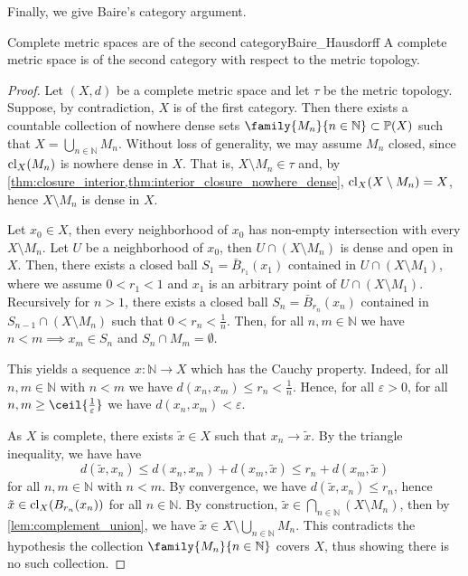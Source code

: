 Finally, we give Baire's category argument.
\begin{theorem}{Complete metric spaces are of the second category}{Baire_Hausdorff}
    A complete metric space is of the second category with respect to the metric topology.
\end{theorem}
\begin{proof}
    Let \((X, d)\) be a complete metric space and let \(\tau\) be the metric topology. Suppose, by contradiction, \(X\) is of the first category. Then there exists a countable collection of nowhere dense sets \(\family{M_n}{n \in \mathbb{N}} \subset \mathbb{P}(X)\) such that \(X = \bigcup_{n \in \mathbb{N}} M_n\). Without loss of generality, we may assume \(M_n\) closed, since \(\operatorname{cl}_X(M_n)\) is nowhere dense in \(X\). That is, \(X \setminus M_n \in \tau\) and, by \cref{thm:closure_interior,thm:interior_closure_nowhere_dense}, \(\operatorname{cl}_X(X \setminus M_n) = X\), hence \(X \setminus M_n\) is dense in \(X\).

    Let \(x_0 \in X\), then every neighborhood of \(x_0\) has non-empty intersection with every \(X\setminus M_n\). Let \(U\) be a neighborhood of \(x_0\), then \(U \cap (X\setminus M_n)\) is dense and open in \(X\). Then, there exists a closed ball \(S_1 = \bar{B}_{r_1}(x_1)\) contained in \(U \cap (X \setminus M_1)\), where we assume \(0 < r_1 < 1\) and \(x_1\) is an arbitrary point of \(U \cap (X \setminus M_1)\). Recursively for \(n > 1\), there exists a closed ball \(S_n = \bar{B}_{r_n}(x_n)\) contained in \(S_{n-1} \cap (X \setminus M_n)\) such that \(0 < r_n < \frac1n\). Then, for all \(n,m \in \mathbb{N}\) we have \(n < m \implies x_m \in S_n\) and \(S_n \cap M_m = \emptyset\).

    This yields a sequence \(x : \mathbb{N} \to X\) which has the Cauchy property. Indeed, for all \(n,m \in \mathbb{N}\) with \(n < m\) we have \(d(x_n, x_m) \leq r_n < \frac1n\). Hence, for all \(\varepsilon > 0\), for all \(n,m \geq \ceil{\frac{1}{\varepsilon}}\) we have \(d(x_n,x_m) < \varepsilon\).


    As \(X\) is complete, there exists \(\tilde{x} \in X\) such that \(x_n \to \tilde{x}\). By the triangle inequality, we have have
    \begin{equation*}
        d(\tilde{x}, x_n) \leq d(x_n, x_m) + d(x_m, \tilde{x}) \leq r_n + d(x_m, \tilde{x})
    \end{equation*}
    for all \(n,m \in \mathbb{N}\) with \(n < m\). By convergence, we have \(d(\tilde{x}, x_n) \leq r_n\), hence \(\tilde{x} \in \operatorname{cl}_X(B_{r_n}(x_n))\) for all \(n\in \mathbb{N}\). By construction, \(\tilde{x} \in \bigcap_{n\in \mathbb{N}} (X\setminus M_n)\), then by \cref{lem:complement_union}, we have \(\tilde{x} \in X \setminus \bigcup_{n\in \mathbb{N}} M_n\). This contradicts the hypothesis the collection \(\family{M_n}{n\in \mathbb{N}}\) covers \(X\), thus showing there is no such collection.
\end{proof}

